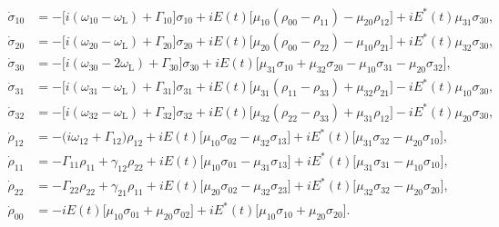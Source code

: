 \begin{align*}
\dot{\sigma}_{10}
&=
-\bigl[i(\omega_{10}-\omega_{\mathrm{L}})+\Gamma_{10}\bigr]\sigma_{10}
+ iE(t)\bigl[\mu_{10}(\rho_{00}-\rho_{11})-\mu_{20}\rho_{12}\bigr]
+ iE^{*}(t)\mu_{31}\sigma_{30},
\\
\dot{\sigma}_{20}
&=
-\bigl[i(\omega_{20}-\omega_{\mathrm{L}})+\Gamma_{20}\bigr]\sigma_{20}
+ iE(t)\bigl[\mu_{20}(\rho_{00}-\rho_{22})-\mu_{10}\rho_{21}\bigr]
+ iE^{*}(t)\mu_{32}\sigma_{30},
\\
\dot{\sigma}_{30}
&=
-\bigl[i(\omega_{30}-2\omega_{\mathrm{L}})+\Gamma_{30}\bigr]\sigma_{30}
+ iE(t)\bigl[\mu_{31}\sigma_{10}+\mu_{32}\sigma_{20}
- \mu_{10}\sigma_{31}-\mu_{20}\sigma_{32}\bigr],
\\
\dot{\sigma}_{31}
&=
-\bigl[i(\omega_{31}-\omega_{\mathrm{L}})+\Gamma_{31}\bigr]\sigma_{31}
+ iE(t)\bigl[\mu_{31}(\rho_{11}-\rho_{33})+\mu_{32}\rho_{21}\bigr]
- iE^{*}(t)\mu_{10}\sigma_{30},
\\
\dot{\sigma}_{32}
&=
-\bigl[i(\omega_{32}-\omega_{\mathrm{L}})+\Gamma_{32}\bigr]\sigma_{32}
+ iE(t)\bigl[\mu_{32}(\rho_{22}-\rho_{33})+\mu_{31}\rho_{12}\bigr]
- iE^{*}(t)\mu_{20}\sigma_{30},
\\
\dot{\rho}_{12}
&=
-\bigl(i\omega_{12}+\Gamma_{12}\bigr)\rho_{12}
+ iE(t)\bigl[\mu_{10}\sigma_{02}-\mu_{32}\sigma_{13}\bigr]
+ iE^{*}(t)\bigl[\mu_{31}\sigma_{32}-\mu_{20}\sigma_{10}\bigr],
\\
\dot{\rho}_{11}
&=
-\Gamma_{11}\rho_{11}
+ \gamma_{12}\rho_{22}
+ iE(t)\bigl[\mu_{10}\sigma_{01}-\mu_{31}\sigma_{13}\bigr]
+ iE^{*}(t)\bigl[\mu_{31}\sigma_{31}-\mu_{10}\sigma_{10}\bigr],
\\
\dot{\rho}_{22}
&=
-\Gamma_{22}\rho_{22}
+ \gamma_{21}\rho_{11}
+ iE(t)\bigl[\mu_{20}\sigma_{02}-\mu_{32}\sigma_{23}\bigr]
+ iE^{*}(t)\bigl[\mu_{32}\sigma_{32}-\mu_{20}\sigma_{20}\bigr],
\\
\dot{\rho}_{00}
&=
-iE(t)\bigl[\mu_{10}\sigma_{01}+\mu_{20}\sigma_{02}\bigr]
+ iE^{*}(t)\bigl[\mu_{10}\sigma_{10}+\mu_{20}\sigma_{20}\bigr].
\end{align*}

